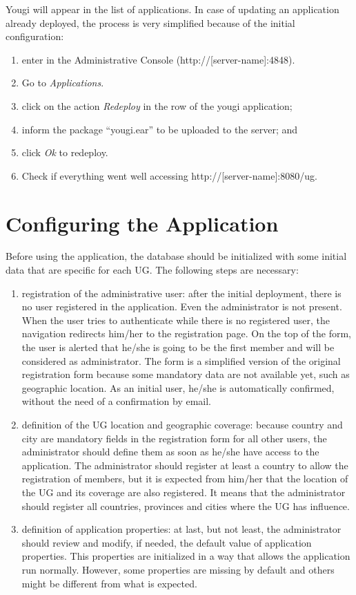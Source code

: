\documentclass[envcountsame,envcountchap,letterpaper]{svmono}
\begin{document}
Yougi will appear in the list of applications. In case of updating an application already deployed, the process is very simplified because of the initial configuration:

\begin{enumerate}
\item enter in the Administrative Console (http://[server-name]:4848).
\item Go to \textit{Applications}.
\item click on the action \textit{Redeploy} in the row of the yougi application;
\item inform the package “yougi.ear” to be uploaded to the server; and
\item click \textit{Ok} to redeploy.
\item Check if everything went well accessing http://[server-name]:8080/ug.
\end{enumerate}

\section{Configuring the Application}

Before using the application, the database should be initialized with some initial data that are specific for each UG. The following steps are necessary:

\begin{enumerate}
\item registration of the administrative user: after the initial deployment, there is no user registered in the application. Even the administrator is not present. When the user tries to authenticate while there is no registered user, the navigation redirects him/her to the registration page. On the top of the form, the user is alerted that he/she is going to be the first member and will be considered as administrator. The form is a simplified version of the original registration form because some mandatory data are not available yet, such as geographic location. As an initial user, he/she is automatically confirmed, without the need of a confirmation by email.
\item definition of the UG location and geographic coverage: because country and city are mandatory fields in the registration form for all other users, the administrator should define them as soon as he/she have access to the application. The administrator should register at least a country to allow the registration of members, but it is expected from him/her that the location of the UG and its coverage are also registered. It means that the administrator should register all countries, provinces and cities where the UG has influence.
\item definition of application properties: at last, but not least, the administrator should review and modify, if needed, the default value of application properties. This properties are initialized in a way that allows the application run normally. However, some properties are missing by default and others might be different from what is expected.
\end{enumerate}
\end{document}
